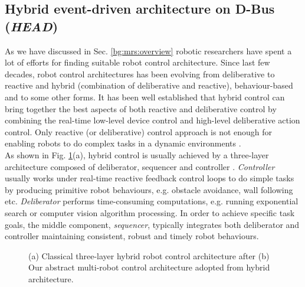 \subsection{Hybrid event-driven architecture on D-Bus ({\em HEAD})}
As we have discussed in Sec. \ref{bg:mrs:overview} robotic researchers have spent a lot of efforts for finding suitable robot control architecture.  Since last few decades, robot control architectures has been evolving from deliberative to reactive and hybrid (combination of deliberative and reactive), behaviour-based and to some other forms. It has been well established that hybrid control can bring together the best aspects of both reactive and deliberative control by combining the real-time low-level device control and high-level deliberative action control. Only reactive (or deliberative) control approach is not enough for enabling robots to do complex tasks in a dynamic environments \cite{Gat1997}.\\
As shown in Fig. \ref{fig:three-layer-arch}(a), hybrid control is usually achieved by a three-layer architecture composed of deliberator, sequencer and controller . {\em Controller} usually works under real-time reactive feedback control loops to do simple tasks by producing primitive robot behaviours, e.g. obstacle avoidance, wall following etc. {\em Deliberator} performs time-consuming computations, e.g. running exponential search or computer vision algorithm processing. In order to achieve specific task goals, the middle component, {\em sequencer}, typically integrates both deliberator and controller maintaining consistent, robust and timely robot behaviours.\\
\begin{figure}
\centering
{} 
\hspace{0.25cm}
\caption{(a) Classical three-layer hybrid robot control architecture after \protect{} 
(b) Our abstract multi-robot control architecture adopted from hybrid architecture.}
\label{fig:three-layer-arch}
\end{figure}
